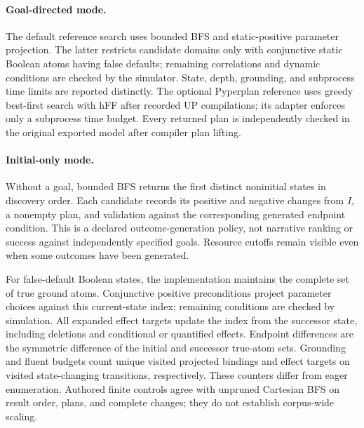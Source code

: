 \paragraph{Goal-directed mode.}
The default reference search uses bounded BFS and static-positive parameter projection. The latter restricts candidate domains only with conjunctive static Boolean atoms having false defaults; remaining correlations and dynamic conditions are checked by the simulator. State, depth, grounding, and subprocess time limits are reported distinctly. The optional Pyperplan reference uses greedy best-first search with hFF after recorded UP compilations; its adapter enforces only a subprocess time budget. Every returned plan is independently checked in the original exported model after compiler plan lifting.

\paragraph{Initial-only mode.}
Without a goal, bounded BFS returns the first distinct noninitial states in discovery order. Each candidate records its positive and negative changes from $I$, a nonempty plan, and validation against the corresponding generated endpoint condition. This is a declared outcome-generation policy, not narrative ranking or success against independently specified goals. Resource cutoffs remain visible even when some outcomes have been generated.

For false-default Boolean states, the implementation maintains the complete set of true ground atoms. Conjunctive positive preconditions project parameter choices against this current-state index; remaining conditions are checked by simulation. All expanded effect targets update the index from the successor state, including deletions and conditional or quantified effects. Endpoint differences are the symmetric difference of the initial and successor true-atom sets. Grounding and fluent budgets count unique visited projected bindings and effect targets on visited state-changing transitions, respectively. These counters differ from eager enumeration. Authored finite controls agree with unpruned Cartesian BFS on result order, plans, and complete changes; they do not establish corpus-wide scaling.
